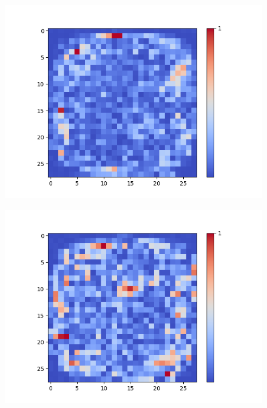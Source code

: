 \begin{figure}[H]
	\captionsetup{labelformat=empty}
	\centering
	\begin{minipage}[b]{0.19\textwidth}
		\includegraphics[width=\textwidth]{Sigmoid(Hidden-Layer)/Layer0-Neuron-6.png}
		\label{}
	\end{minipage}
	\begin{minipage}[b]{0.19\textwidth}
		\includegraphics[width=\textwidth]{Sigmoid(Hidden-Layer)/Layer0-Neuron-7.png}
		\label{}
	\end{minipage}
	\begin{minipage}[b]{0.19\textwidth}

\end{minipage}
\end{figure}

